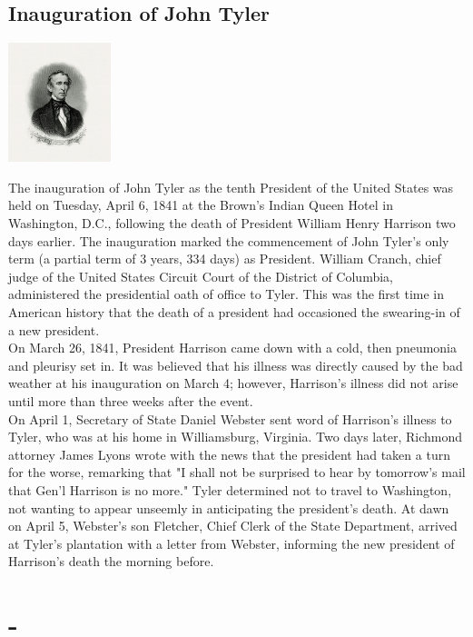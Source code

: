 \documentclass[11pt]{report}
\begin{document}
\subsection{Inauguration of John Tyler}
\vspace{2mm}\begin{center}\includegraphics[width=3cm]{./img/johnTyler.jpg}\end{center}
The inauguration of John Tyler as the tenth President of the United States was held on Tuesday, April 6, 1841 at the Brown’s Indian Queen Hotel in Washington, D.C., following the death of President William Henry Harrison two days earlier. The inauguration marked the commencement of John Tyler's only term (a partial term of 3 years, 334 days) as President. William Cranch, chief judge of the United States Circuit Court of the District of Columbia, administered the presidential oath of office to Tyler. This was the first time in American history that the death of a president had occasioned the swearing-in of a new president.\\
\indent On March 26, 1841, President Harrison came down with a cold, then pneumonia and pleurisy set in. It was believed that his illness was directly caused by the bad weather at his inauguration on March 4; however, Harrison's illness did not arise until more than three weeks after the event.\\
\indent On April 1, Secretary of State Daniel Webster sent word of Harrison's illness to Tyler, who was at his home in Williamsburg, Virginia. Two days later, Richmond attorney James Lyons wrote with the news that the president had taken a turn for the worse, remarking that "I shall not be surprised to hear by tomorrow's mail that Gen'l Harrison is no more." Tyler determined not to travel to Washington, not wanting to appear unseemly in anticipating the president's death. At dawn on April 5, Webster's son Fletcher, Chief Clerk of the State Department, arrived at Tyler's plantation with a letter from Webster, informing the new president of Harrison's death the morning before.
\section{-}
\end{document}
